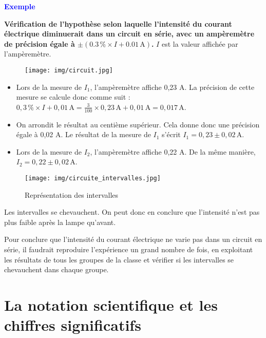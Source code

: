 \documentclass[a4paper,12pt]{article}
\begin{document}
\textcolor{blue}{\textbf{Exemple}}

\vspace{1em}

\textbf{Vérification de l’hypothèse selon laquelle l’intensité du courant électrique diminuerait dans un circuit en série, avec un ampèremètre de précision égale à $\pm (0.3 \, \% \times I + 0.01 \, \text{A})$.} $I$ est la valeur affichée par l’ampèremètre.

\begin{figure}[H]
  \centering
  \texttt{[image: img/circuit.jpg]}
\end{figure}

\begin{itemize}[noitemsep]
    \item Lors de la mesure de $I_1$, l’ampèremètre affiche 0,23 A.
    La précision de cette mesure se calcule donc comme suit :
    $0,3 \, \% \times I + 0,01 \, \text{A} = \frac{3}{100} \times 0,23 \, \text{A} + 0,01 \, \text{A} = 0,017 \, \text{A}$.
    
    \item On arrondit le résultat au centième supérieur.
    Cela donne donc une précision égale à 0,02 A.
    Le résultat de la mesure de $I_1$ s’écrit \textbf{$I_1 = 0,23 \pm 0,02 \, \text{A}$}.
    
    \item Lors de la mesure de $I_2$, l’ampèremètre affiche 0,22 A.
    De la même manière, \textbf{$I_2 = 0,22 \pm 0,02 \, \text{A}$}.
\end{itemize}


\begin{figure}[H]
  \centering
  \texttt{[image: img/circuite\_intervalles.jpg]}
  \caption{Représentation des intervalles}
\end{figure}

Les intervalles se chevauchent. On peut donc en conclure que l’intensité n’est pas plus faible après la lampe qu’avant.

\vspace{1em}

Pour conclure que l’intensité du courant électrique ne varie pas dans un circuit en série, il faudrait reproduire l’expérience un grand nombre de fois, en exploitant les résultats de tous les groupes de la classe et vérifier si les intervalles se chevauchent dans chaque groupe.


\section{La notation scientifique et les chiffres significatifs}
\end{document}
